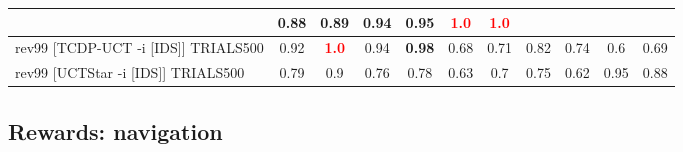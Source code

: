 \documentclass{article}
\begin{document}
\begin{tabular}{|l|r@{$\pm$}rr@{$\pm$}rr@{$\pm$}rr@{$\pm$}rr@{$\pm$}rr@{$\pm$}rr@{$\pm$}rr@{$\pm$}rr@{$\pm$}rr@{$\pm$}r|}
& \multicolumn{2}{c}{0.88}
& \multicolumn{2}{c}{0.89}
& \multicolumn{2}{c}{0.94}
& \multicolumn{2}{c}{0.95}
& \multicolumn{2}{c}{\textbf{\textcolor{red}{1.0}}}
& \multicolumn{2}{c|}{\textbf{\textcolor{red}{1.0}}}
\\
\hline
rev99 [TCDP-UCT -i [IDS]] TRIALS500
& \multicolumn{2}{c}{0.92}
& \multicolumn{2}{c}{\textbf{\textcolor{red}{1.0}}}
& \multicolumn{2}{c}{0.94}
& \multicolumn{2}{c}{\textbf{0.98}}
& \multicolumn{2}{c}{0.68}
& \multicolumn{2}{c}{0.71}
& \multicolumn{2}{c}{0.82}
& \multicolumn{2}{c}{0.74}
& \multicolumn{2}{c}{0.6}
& \multicolumn{2}{c|}{0.69}
\\
rev99 [UCTStar -i [IDS]] TRIALS500
& \multicolumn{2}{c}{0.79}
& \multicolumn{2}{c}{0.9}
& \multicolumn{2}{c}{0.76}
& \multicolumn{2}{c}{0.78}
& \multicolumn{2}{c}{0.63}
& \multicolumn{2}{c}{0.7}
& \multicolumn{2}{c}{0.75}
& \multicolumn{2}{c}{0.62}
& \multicolumn{2}{c}{0.95}
& \multicolumn{2}{c|}{0.88}
\\
\hline
\end{tabular}%

\bigskip

\subsection*{Rewards: navigation}
\end{document}
